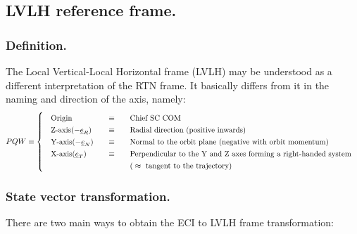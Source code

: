 	\subsection{LVLH reference frame.}
		\subsubsection{Definition.}
		\indent The Local Vertical-Local Horizontal frame (LVLH) may be understood as a different interpretation of the RTN frame. It basically differs from it in the naming and direction of the axis, namely:
		\[
		\arraycolsep=10pt
		\def\arraystretch{1.3}
		PQW\equiv\left\{
		\begin{array}{lll}
		\text{Origin} 	& \equiv 	& \text{Chief SC COM} \\
		\text{Z-axis}(-\underline{e}_R) 	& \equiv 	& \text{Radial direction (positive inwards)}\\
		\text{Y-axis}(-\underline{e}_N) 	& \equiv 	& \text{Normal to the orbit plane (negative with orbit momentum)} \\
		\text{X-axis}(\underline{e}_T) 	& \equiv 	& \text{Perpendicular to the Y and Z axes forming a right-handed system} \\
									 	& 			& \text{(} \approx \text{ tangent to the trajectory)}
		\end{array}
		\right.
		\]
		\subsubsection{State vector transformation.}
		\indent There are two main ways to obtain the ECI to LVLH frame transformation:
